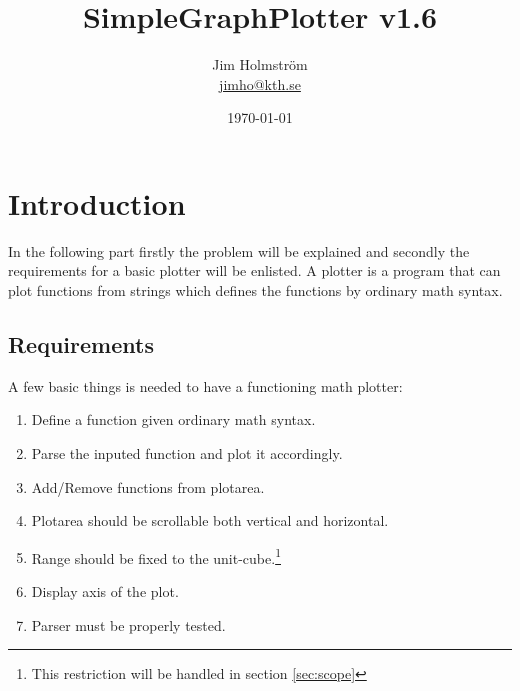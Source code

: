 \documentclass[a4paper,11pt]{kth-mag}
\title{SimpleGraphPlotter v1.6}
\subtitle{}
\author{Jim Holmstr\"{o}m\\\href{mailto:jimho@kth.se}{jimho@kth.se}}
\date{\today}
\begin{document}
\frontmatter
\pagestyle{empty}
\removepagenumbers
\maketitle
{}


\tableofcontents*
\mainmatter
\pagestyle{newchap}

\chapter{Introduction}
In the following part firstly the problem will be explained and secondly the requirements for a basic plotter will be enlisted.
A plotter is a program that can plot functions from strings which defines the functions by ordinary math syntax.

\section{Requirements}
A few basic things is needed to have a functioning math plotter:
\begin{enumerate}
    \item Define a function given ordinary math syntax.
    \item Parse the inputed function and plot it accordingly.
    \item Add/Remove functions from plotarea.
    \item Plotarea should be scrollable both vertical and horizontal.
    \item Range should be fixed to the unit-cube.\footnote{This restriction will be handled in section \ref{sec:scope}}
    \item Display axis of the plot.
    \item Parser must be properly tested.
\end{enumerate}
\end{document}
